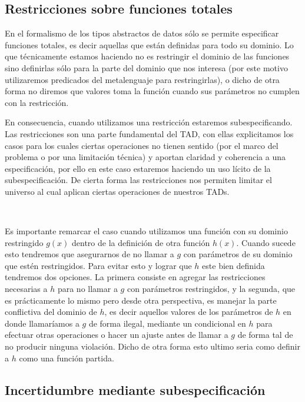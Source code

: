 \documentclass[10pt, a4paper]{report}
\begin{document}
\subsection{Restricciones sobre funciones totales}

En el formalismo de los tipos abstractos de datos s\'olo se permite especificar funciones totales, es decir aquellas que est\'an definidas para todo su dominio. Lo que t\'ecnicamente estamos haciendo no es restringir el dominio de las funciones sino definirlas s\'olo para la parte del dominio que nos interesa (por este motivo utilizaremos predicados del metalenguaje para restringirlas), o dicho de otra forma no diremos que valores toma la funci\'on cuando sus par\'ametros no cumplen con la restricci\'on. 

En consecuencia, cuando utilizamos una restricci\'on estaremos subespecificando. Las restricciones son una parte fundamental del TAD, con ellas explicitamos los casos para los cuales ciertas operaciones no tienen sentido (por el marco del problema o por una limitaci\'on t\'ecnica) y aportan claridad y coherencia a una especificaci\'on, por ello en este caso estaremos haciendo un uso l\'icito de la subespecificaci\'on. De cierta forma las restricciones nos permiten limitar el universo al cual aplican ciertas operaciones de nuestros TADs.

~

Es importante remarcar el caso cuando utilizamos una funci\'on con su dominio restringido $g(x)$ dentro de la definici\'on de otra funci\'on $h(x)$. Cuando sucede esto tendremos que asegurarnos de no llamar a $g$ con par\'ametros de su dominio que est\'en restringidos. Para evitar esto y lograr que $h$ este bien definida tendremos dos opciones. La primera consiste en agregar las restricciones necesarias a $h$ para no llamar a $g$ con par\'ametros restringidos, y la segunda, que es pr\'acticamente lo mismo pero desde otra perspectiva, es manejar la parte conflictiva del dominio de $h$, es decir aquellos valores de los par\'ametros de $h$ en donde llamar\'iamos a $g$ de forma ilegal, mediante un condicional en $h$ para efectuar otras operaciones o hacer un ajuste antes de llamar a $g$ de forma tal de no producir ninguna violaci\'on. Dicho de otra forma esto ultimo seria como definir a $h$ como una funci\'on partida.

\subsection{Incertidumbre mediante subespecificaci\'on}
\end{document}
